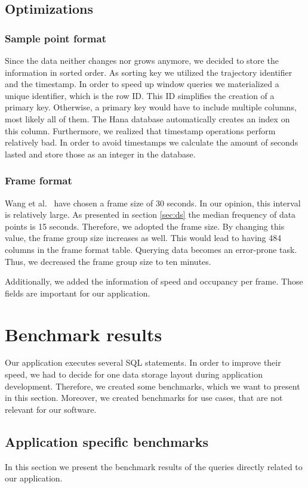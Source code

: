 \documentclass[10pt]{sig-alternate}
\begin{document}
\subsection{Optimizations}

\subsubsection{Sample point format}

Since the data neither changes nor grows anymore, we decided to store the information in sorted order. As sorting key we utilized the trajectory identifier and the timestamp. In order to speed up window queries we materialized a unique identifier, which is the row ID. This ID simplifies the creation of a primary key. Otherwise, a primary key would have to include multiple columns, most likely all of them. The Hana database automatically creates an index on this column. Furthermore, we realized that timestamp operations perform relatively bad. In order to avoid timestamps we calculate the amount of seconds lasted and store those as an integer in the database.

\subsubsection{Frame format}
Wang et al.~\cite{wang} have chosen a frame size of 30 seconds. In our opinion, this interval is relatively large. As presented in section \ref{sec:ds} the median frequency of data points is 15 seconds. Therefore, we adopted the frame size. By changing this value, the frame group size increases as well. This would lead to having 484 columns in the frame format table. Querying data becomes an error-prone task. Thus, we decreased the frame group size to ten minutes.

Additionally, we added the information of speed and occupancy per frame. Those fields are important for our application.

\section{Benchmark results}
Our application executes several SQL statements. In order to improve their speed, we had to decide for one data storage layout during application development. Therefore, we created some benchmarks, which we want to present in this section. Moreover, we created benchmarks for use cases, that are not relevant for our software.

\subsection{Application specific benchmarks}
In this section we present the benchmark results of the queries directly related to our application.
\end{document}
